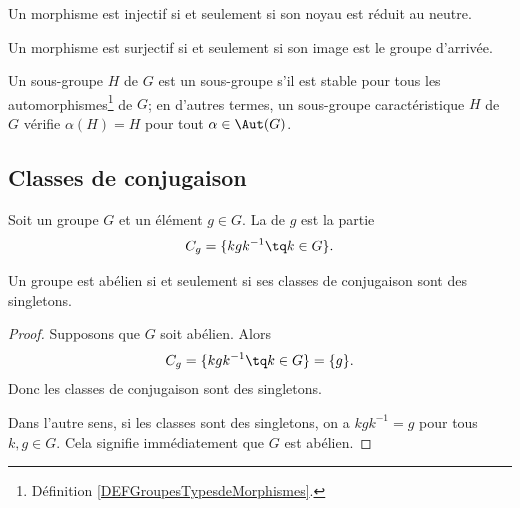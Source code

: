 \begin{lemma}
Un morphisme est injectif si et seulement si son noyau est réduit au neutre.

Un morphisme est surjectif si et seulement si son image est le groupe d'arrivée.
\end{lemma}

\begin{definition}      \label{DEFooUXXTooCCLmQe}
    Un sous-groupe \( H\) de \( G\) est un sous-groupe  s'il est stable pour tous les automorphismes\footnote{Définition \ref{DEFGroupesTypesdeMorphismes}.} de \(G \); en d'autres termes, un sous-groupe caractéristique \(H \) de \(G \) vérifie \( \alpha(H)=H\) pour tout \( \alpha\in \Aut(G)\).
\end{definition}


\subsection{Classes de conjugaison}

\begin{definition}
    Soit un groupe \( G\) et un élément \( g\in G\). La  de \( g\) est la partie
    \begin{equation}
        C_g=\{ kgk^{-1}\tq k\in G \}.
    \end{equation}
\end{definition}

\begin{lemma}       \label{LEMooQYBJooYwMwGM}
    Un groupe est abélien si et seulement si ses classes de conjugaison sont des singletons.
\end{lemma}

\begin{proof}
    Supposons que \( G\) soit abélien. Alors
    \begin{equation}
        C_g=\{ kgk^{-1}\tq k\in G \}=\{ g \}.
    \end{equation}
    Donc les classes de conjugaison sont des singletons.

    Dans l'autre sens, si les classes sont des singletons, on a \( kgk^{-1}=g\) pour tous \( k,g\in G\). Cela signifie immédiatement que \( G\) est abélien.
\end{proof}


